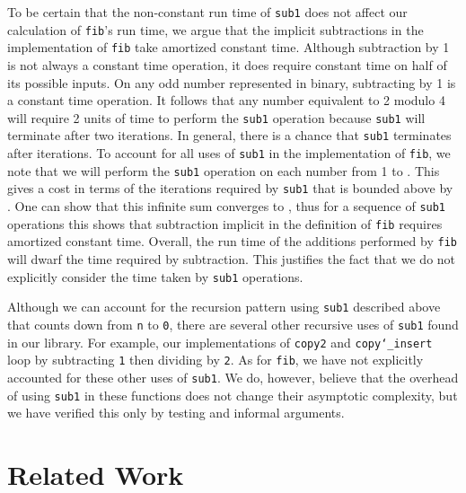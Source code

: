 \documentclass{llncs}
\newcommand{\sectionNewpage}{}
\newcommand{\Scribtexttt}[1]{{\texttt{#1}}}
\let\SOriginalthesubsection\thesubsection
\newcommand{\Ssection}[2]{\section[#1]{#2}\let\thesubsection\SOriginalthesubsection}
\begin{document}
To be certain that the non{-}constant run time of \Scribtexttt{sub1} does not affect our
calculation of \Scribtexttt{fib}{'}s run time, we argue that the implicit subtractions
in the implementation of \Scribtexttt{fib} take amortized constant time.
Although subtraction by 1 is not always a constant time operation, it does require
constant time on half of its possible inputs. On any odd number represented
in binary, subtracting by 1 is a constant time operation. It follows
that any number equivalent to 2 modulo 4 will require 2 units of time
to perform the \Scribtexttt{sub1} operation because \Scribtexttt{sub1} will terminate after two
iterations. In general, there is a
chance that \Scribtexttt{sub1} terminates after
iterations. To account for all uses of \Scribtexttt{sub1} in the implementation of
\Scribtexttt{fib}, we note that we will perform the \Scribtexttt{sub1} operation on each number
from 1 to . This gives a cost in terms of the iterations required by
\Scribtexttt{sub1} that is bounded above by
.
One can show that this infinite sum converges to , thus for a sequence of
 \Scribtexttt{sub1} operations this shows
that subtraction implicit in the definition of \Scribtexttt{fib} requires amortized constant time.
Overall, the run time of the additions performed by \Scribtexttt{fib}
will dwarf the time required by subtraction. This justifies the fact that we do not
explicitly consider the time taken by \Scribtexttt{sub1} operations.

Although we can account for the recursion pattern using \Scribtexttt{sub1} described above that
counts down from \Scribtexttt{n} to \Scribtexttt{0}, there are several other recursive uses of \Scribtexttt{sub1}
found in our library. For example, our implementations of \Scribtexttt{copy2} and \Scribtexttt{copy{\char`\_}insert}
loop by subtracting \Scribtexttt{1} then dividing by \Scribtexttt{2}. As for \Scribtexttt{fib}, we have not explicitly
accounted for these other uses of \Scribtexttt{sub1}. We do, however, believe that the overhead of
using \Scribtexttt{sub1} in these functions does not change their asymptotic complexity, but we have
verified this only by testing and informal arguments.

\sectionNewpage

\Ssection{Related Work}{Related Work}\label{t:x28part_x22secx3arelatedx2dworkx22x29}
\end{document}
